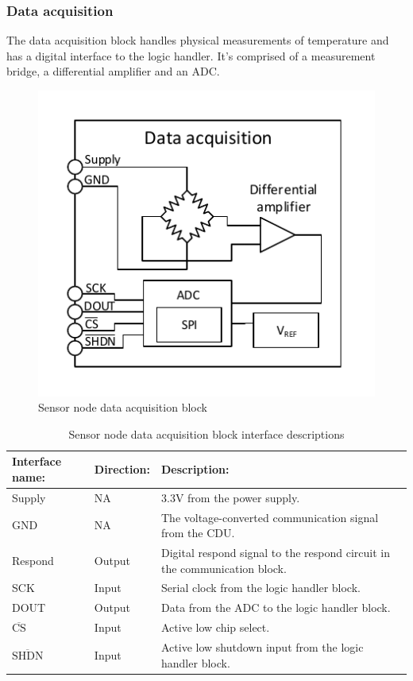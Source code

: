 \subsubsection{Data acquisition}

The data acquisition block handles physical measurements of temperature and has a digital interface to the logic handler. It's comprised of a measurement bridge, a differential amplifier and an ADC.

\begin{figure}[H]
	\centering
	\includegraphics[width=.5\textwidth]{billeder/data_aqcuisition_sn}
	\caption{Sensor node data acquisition block}
	\label{fig:sn_data_acquisition}
\end{figure}

\begin{table}[H]
	\centering
	\begin{tabular}{|p{3cm} |p{2cm} | p{8cm}| }
		\hline
		Interface name: 			& Direction: 	& Description: \\ \hline
		Supply						& NA			& 3.3V from the power supply. \\ \hline
		GND							& NA			& The voltage-converted communication signal from the CDU.\\ \hline
		Respond		  				& Output		& Digital respond signal to the respond circuit in the communication block. \\ \hline
		SCK							& Input			& Serial clock from the logic handler block.\\\hline
		DOUT						& Output		& Data from the ADC to the logic handler block.\\\hline
		$\overline{\text{CS}}$		& Input			& Active low chip select.\\\hline
		$\overline{\text{SHDN}}$	& Input			& Active low shutdown input from the logic handler block.\\\hline
	\end{tabular}
	\caption{Sensor node data acquisition block interface descriptions}
\end{table}

